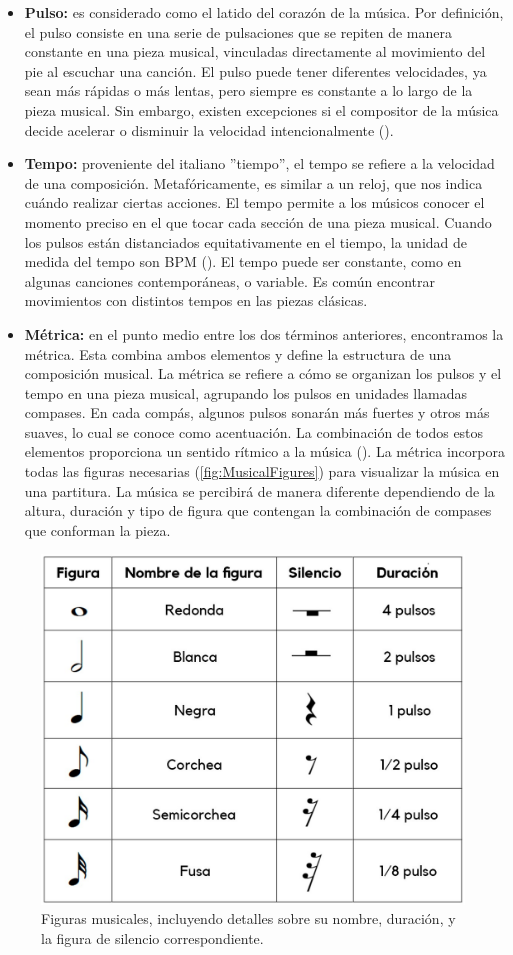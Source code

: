 \begin{itemize}
	\item \textbf{Pulso:} es considerado como el latido del corazón de la música. Por definición, el pulso consiste en una serie de pulsaciones que se repiten de manera constante en una pieza musical, vinculadas directamente al movimiento del pie al escuchar una canción. El pulso puede tener diferentes velocidades, ya sean más rápidas o más lentas, pero siempre es constante a lo largo de la pieza musical. Sin embargo, existen excepciones si el compositor de la música decide acelerar o disminuir la velocidad intencionalmente (\cite{VIOLÍNZN:2024}).
	\item \textbf{Tempo:} proveniente del italiano ''tiempo'', el tempo se refiere a la velocidad de una composición. Metafóricamente, es similar a un reloj, que nos indica cuándo realizar ciertas acciones. El tempo permite a los músicos conocer el momento preciso en el que tocar cada sección de una pieza musical. Cuando los pulsos están distanciados equitativamente en el tiempo, la unidad de medida del tempo son BPM (\cite{MASTEREDBLOGS:2021}). El tempo puede ser constante, como en algunas canciones contemporáneas, o variable. Es común encontrar movimientos con distintos tempos en las piezas clásicas.
	\item \textbf{Métrica:} en el punto medio entre los dos términos anteriores, encontramos la métrica. Esta combina ambos elementos y define la estructura de una composición musical. La métrica se refiere a cómo se organizan los pulsos y el tempo en una pieza musical, agrupando los pulsos en unidades llamadas compases. En cada compás, algunos pulsos sonarán más fuertes y otros más suaves, lo cual se conoce como acentuación. La combinación de todos estos elementos proporciona un sentido rítmico a la música (\cite{COMPOMUSICAL:2024}). La métrica incorpora todas las figuras necesarias (\autoref{fig:MusicalFigures}) para visualizar la música en una partitura. La música se percibirá de manera diferente dependiendo de la altura, duración y tipo de figura que contengan la combinación de compases que conforman la pieza.
\end{itemize}

\begin{figure}[h!]
	\centering
	\includegraphics[width=0.4\linewidth]{Figuras/Estado/FigurasMusicales.jpg}
	\caption{Figuras musicales, incluyendo detalles sobre su nombre, duración, y la figura de silencio correspondiente.}
	\label{fig:MusicalFigures}
	\vspace{-35pt}
\end{figure}

